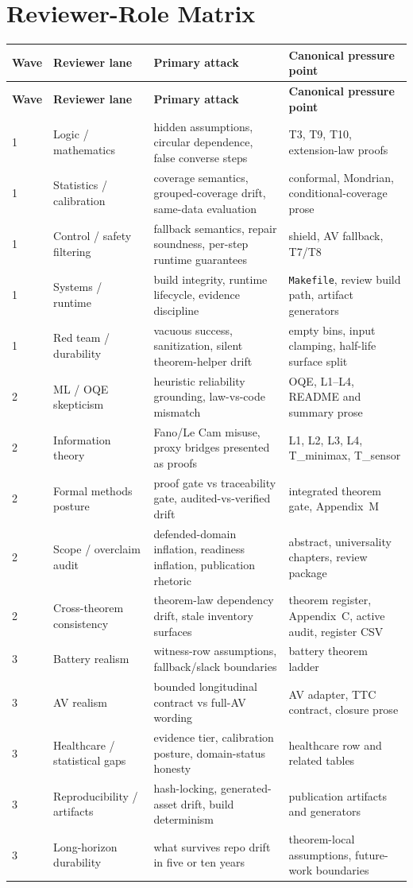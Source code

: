 \section{Reviewer-Role Matrix}

\begin{longtable}{p{}p{}p{}p{}}
\toprule
\textbf{Wave} & \textbf{Reviewer lane} & \textbf{Primary attack} & \textbf{Canonical pressure point} \\
\midrule
\endfirsthead
\toprule
\textbf{Wave} & \textbf{Reviewer lane} & \textbf{Primary attack} & \textbf{Canonical pressure point} \\
\midrule
\endhead
1 & Logic / mathematics & hidden assumptions, circular dependence, false converse steps & T3, T9, T10, extension-law proofs \\
1 & Statistics / calibration & coverage semantics, grouped-coverage drift, same-data evaluation & conformal, Mondrian, conditional-coverage prose \\
1 & Control / safety filtering & fallback semantics, repair soundness, per-step runtime guarantees & shield, AV fallback, T7/T8 \\
1 & Systems / runtime & build integrity, runtime lifecycle, evidence discipline & \texttt{Makefile}, review build path, artifact generators \\
1 & Red team / durability & vacuous success, sanitization, silent theorem-helper drift & empty bins, input clamping, half-life surface split \\
2 & ML / OQE skepticism & heuristic reliability grounding, law-vs-code mismatch & OQE, L1--L4, README and summary prose \\
2 & Information theory & Fano/Le Cam misuse, proxy bridges presented as proofs & L1, L2, L3, L4, T\_minimax, T\_sensor \\
2 & Formal methods posture & proof gate vs traceability gate, audited-vs-verified drift & integrated theorem gate, Appendix~M \\
2 & Scope / overclaim audit & defended-domain inflation, readiness inflation, publication rhetoric & abstract, universality chapters, review package \\
2 & Cross-theorem consistency & theorem-law dependency drift, stale inventory surfaces & theorem register, Appendix~C, active audit, register CSV \\
3 & Battery realism & witness-row assumptions, fallback/slack boundaries & battery theorem ladder \\
3 & AV realism & bounded longitudinal contract vs full-AV wording & AV adapter, TTC contract, closure prose \\
3 & Healthcare / statistical gaps & evidence tier, calibration posture, domain-status honesty & healthcare row and related tables \\
3 & Reproducibility / artifacts & hash-locking, generated-asset drift, build determinism & publication artifacts and generators \\
3 & Long-horizon durability & what survives repo drift in five or ten years & theorem-local assumptions, future-work boundaries \\
\bottomrule
\end{longtable}

